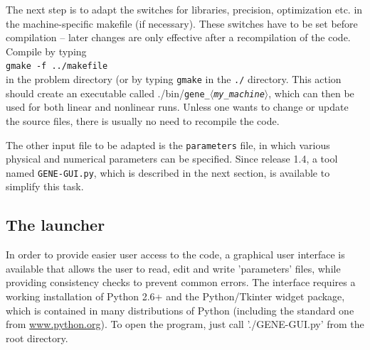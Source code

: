 \documentclass[12pt]{article}
\newcommand{\mach}{$\langle$\textsl{my\_machine}$\rangle$}
\begin{document}
The next step is to adapt the switches for libraries, precision, optimization etc. in the machine-specific
makefile (if necessary). These switches have to be set before compilation -- later changes are only effective
after a recompilation of the code. Compile \gene by typing \\
\qquad\verb|gmake -f ../makefile| \\
in the problem directory (or by typing \verb|gmake| in the \texttt{./} directory. This action should create 
an executable called ./bin/\texttt{gene\_\mach}, which can then
be used for both linear and nonlinear runs. Unless one wants to change or update the source files, there is
usually no need to recompile the code.

The other input file to be adapted is the \texttt{parameters} file, in which various physical and numerical 
parameters can be specified. Since release 1.4, a tool named \texttt{GENE-GUI.py}, which is described 
in the next section, is available to simplify this task.


\subsection{The \gene launcher}
In order to provide easier user access to the \gene code, a graphical user interface is available that allows
the user to read, edit and write 'parameters' files, while providing consistency checks to prevent common 
errors. 
The interface requires a working installation of Python 2.6+ and the Python/Tkinter widget package, which
is contained in many distributions of Python (including the standard one from \url{www.python.org}). To open the program,
just call './GENE-GUI.py' from the \gene root directory. 
\end{document}
